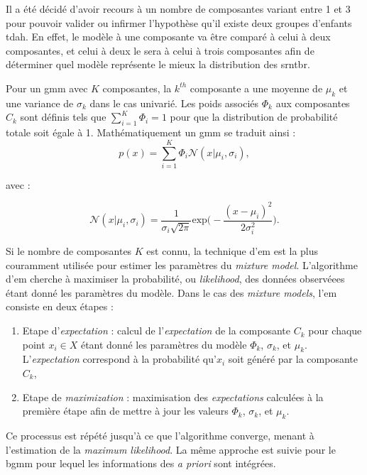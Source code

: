 Il a été décidé d'avoir recours à un nombre de composantes variant entre 1 et 3 pour pouvoir valider ou infirmer l'hypothèse qu'il existe deux groupes d'enfants \gls{tdah}.
En effet, le modèle à une composante va être comparé à celui à deux composantes, et celui à deux le sera à celui à trois composantes afin de déterminer quel modèle 
représente le mieux la distribution des \gls{srntbr}. 

Pour un \gls{gmm} avec $K$ composantes, la $k^{th}$ composante a une moyenne de $\mu_k$ et une variance de $\sigma_k$ dans le cas univarié. Les poids associés $\Phi_k$ aux composantes
$C_k$ sont définis tels que $\sum_{i=1}^{K} \Phi_i = 1$ pour que la distribution de probabilité totale soit égale à 1. Mathématiquement un \gls{gmm} se traduit ainsi \citep{Santosh2013} :
\begin{equation}
\label{eq:tbr_gmm_univariate}
p(x) = \sum_{i=1}^{K} \Phi_i\mathcal{N}( x | \mu_i, \sigma_i),
\end{equation}

avec :

\begin{equation}
\label{eq:tbr_gaussian}
\mathcal{N}( x | \mu_i, \sigma_i) = \frac{1}{\sigma_i\sqrt{2\pi}} \text{exp}\Big(-\frac{(x - \mu_i)^2}{2\sigma_i^2}\Big).
\end{equation}

Si le nombre de composantes $K$ est connu, la technique d'\gls{em} est la plus couramment utilisée pour estimer les paramètres du \textit{mixture model}. L'algorithme d'\gls{em}
cherche à maximiser la probabilité, ou \textit{likelihood}, des données observéees étant donné les paramètres du modèle. Dans le cas des \textit{mixture models}, l'\gls{em}
consiste en deux étapes :
\begin{enumerate}
\item Etape d'\textit{expectation} : calcul de l'\textit{expectation} de la composante $C_k$ pour chaque point $x_i \in X$ étant donné les paramètres du modèle $\Phi_k$, $\sigma_k$,
et $\mu_k$. L'\textit{expectation} correspond à la probabilité qu'$x_i$ soit généré par la composante $C_k$,
\item Etape de \textit{maximization} : maximisation des \textit{expectations} calculées à la première étape afin de mettre à jour les valeurs $\Phi_k$, $\sigma_k$,
et $\mu_k$. 
\end{enumerate}

Ce processus est répété jusqu'à ce que l'algorithme converge, menant à l'estimation de la \textit{maximum likelihood}. La même approche est suivie pour le \gls{bgmm} pour lequel 
les informations des \textit{a priori} sont intégrées. 

